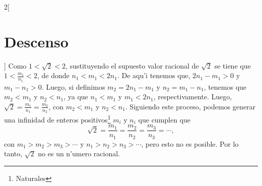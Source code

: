\documentclass[spanish,12pt]{article}
\begin{document}
\begin{multicols}{2}[\section{Descenso}]
\noindent Como  $1< \sqrt{2}<2$, sustituyendo el supuesto valor racional de $\sqrt{2}$ se tiene que  $1< \frac{m_1}{n_1}<2$, de donde
$n_1 < m_1 < 2n_1$. De aqu'i tenemos que, $2n_1-m_1 >0$ y $m_1- n_1 >0$. Luego, si definimos $m_2=2n_1-m_1$ y $n_2=m_1-n_1$, tenemos que $m_2< m_1$ y   $n_2<n_1$, ya que $n_1<m_1$ y $m_1<2n_1$, respectivamente. Luego, $\sqrt{2}=\frac{m_1}{n_1}=\frac{m_2}{n_2}$, con $m_2<m_1$ y $n_2<n_1$. Siguiendo este proceso, podemos generar una infinidad de enteros positivos\footnote{Naturales} $m_i$ y $n_i$ que cumplen que
$$ \sqrt{2} =\frac{m_1}{n_1}=\frac{m_2}{n_2}=\frac{m_3}{n_3}=\cdots,$$
con $m_1 >m_2>m_3>\cdots$ y $n_1 >n_2>n_3>\cdots$,
pero esto no es posible. Por lo tanto, $\sqrt{2}$ no es un n'umero racional.

\end{multicols}

\vspace{.2in}
\end{document}
